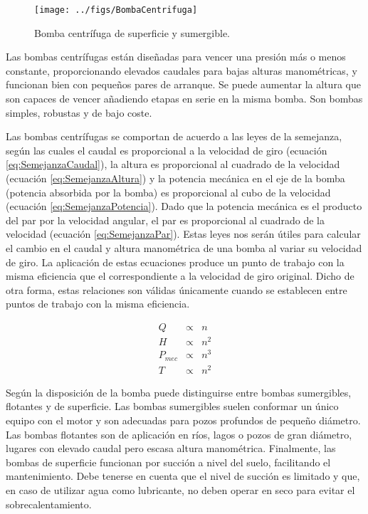 %
\begin{figure}
\begin{centering}
\texttt{[image: ../figs/BombaCentrifuga]}
\end{centering}

\caption{Bomba centrífuga de superficie y sumergible.\label{fig:Bomba-centr=0000EDfuga}}

\end{figure}


Las bombas centrífugas están diseñadas para vencer una presión más
o menos constante, proporcionando elevados caudales para bajas alturas
manométricas, y funcionan bien con pequeños pares de arranque. Se
puede aumentar la altura que son capaces de vencer añadiendo etapas
en serie en la misma bomba. Son bombas simples, robustas y de bajo
coste.

Las bombas centrífugas se comportan de acuerdo a las leyes de la semejanza,
según las cuales el caudal es proporcional a la velocidad de giro
(ecuación \ref{eq:SemejanzaCaudal}), la altura es proporcional al
cuadrado de la velocidad (ecuación \ref{eq:SemejanzaAltura}) y la
potencia mecánica en el eje de la bomba (potencia absorbida por la
bomba) es proporcional al cubo de la velocidad (ecuación \ref{eq:SemejanzaPotencia}).
Dado que la potencia mecánica es el producto del par por la velocidad
angular, el par es proporcional al cuadrado de la velocidad (ecuación
\ref{eq:SemejanzaPar}). Estas leyes nos serán útiles para calcular
el cambio en el caudal y altura manométrica de una bomba al variar
su velocidad de giro. La aplicación de estas ecuaciones produce un
punto de trabajo con la misma eficiencia que el correspondiente a
la velocidad de giro original. Dicho de otra forma, estas relaciones
son válidas únicamente cuando se establecen entre puntos de trabajo
con la misma eficiencia.

\begin{center}
\begin{eqnarray}
Q & \propto & n\label{eq:SemejanzaCaudal}\\
H & \propto & n^{2}\label{eq:SemejanzaAltura}\\
P_{mec} & \propto & n^{3}\label{eq:SemejanzaPotencia}\\
T & \propto & n^{2}\label{eq:SemejanzaPar}\end{eqnarray}

\par\end{center}

Según la disposición de la bomba puede distinguirse entre bombas sumergibles,
flotantes y de superficie. Las bombas sumergibles suelen conformar
un único equipo con el motor y son adecuadas para pozos profundos
de pequeño diámetro. Las bombas flotantes son de aplicación en ríos,
lagos o pozos de gran diámetro, lugares con elevado caudal pero escasa
altura manométrica. Finalmente, las bombas de superficie funcionan
por succión a nivel del suelo, facilitando el mantenimiento. Debe
tenerse en cuenta que el nivel de succión es limitado y que, en caso
de utilizar agua como lubricante, no deben operar en seco para evitar
el sobrecalentamiento.


